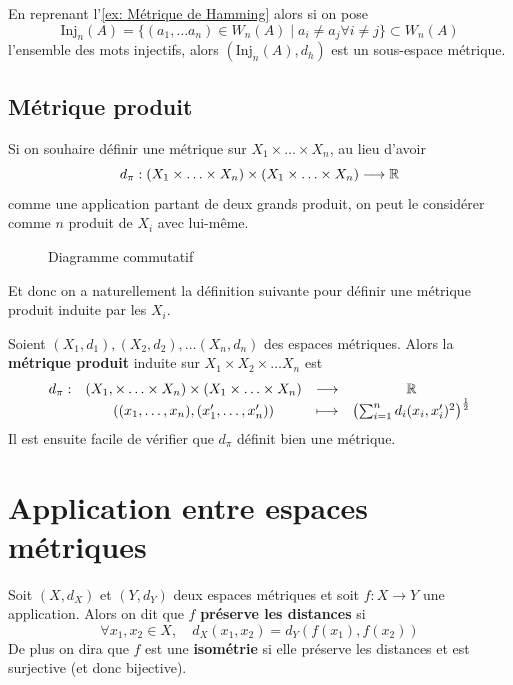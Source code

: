 \begin{exemple}
	En reprenant l'\autoref{ex: Métrique de Hamming} alors si on pose
	\[
	\mathrm{Inj}_n(A) = \{ (a_1, \ldots a_n) \in W_n(A) \mid a_i \neq a_j \forall i\neq j\} \subset W_n(A)
	\]
	l'ensemble des mots injectifs, alors $(\mathrm{Inj}_n(A), d_h)$ est un sous-espace métrique.
\end{exemple}

\subsection{Métrique produit}
Si on souhaire définir une métrique sur $X_1 \times \ldots \times X_n$, au lieu d'avoir
\[
d_\pi : (X_1 \times \ldots \times X_n) \times (X_1 \times \ldots \times X_n) \longrightarrow \mathbb{R}
\]
comme une application partant de deux grands produit, on peut le considérer comme $n$ produit de $X_i$ avec lui-même.
\begin{figure}[H]
	\centering
	\caption{Diagramme commutatif}
\end{figure}
Et donc on a naturellement la définition suivante pour définir une métrique produit induite par les $X_i$.
\begin{definition}
	Soient $(X_1, d_1), (X_2, d_2), \ldots (X_n, d_n)$ des espaces métriques.  Alors  la \textbf{métrique produit} induite sur $X_1 \times X_2 \times \ldots X_n$ est
	\[
	\begin{array}{cccc}
		d_\pi : & (X_1, \times \ldots \times X_n) \times (X_1 \times \ldots \times X_n) & \longrightarrow & \mathbb{R} \\
				& ((x_1, \ldots , x_n), (x_1', \ldots, x_n')) & \longmapsto & \left(\sum_{i=1}^n d_i(x_i, x_i')^2\right)^\frac12
	\end{array} 
	\]
	Il est ensuite facile de vérifier que $d_\pi$ définit bien une métrique.
\end{definition}

\section{Application entre espaces métriques}
\begin{definition}
	Soit $(X, d_X)$ et $(Y, d_Y)$ deux espaces métriques et soit $f : X \to Y$ une application. Alors on dit que $f$ \textbf{préserve les distances} si
	\[
	\forall x_1, x_2 \in X, \quad d_X(x_1, x_2) = d_Y(f(x_1), f(x_2))
	\]
	De plus on dira que $f$ est une \textbf{isométrie} si elle préserve les distances et est surjective (et donc bijective).
\end{definition}

